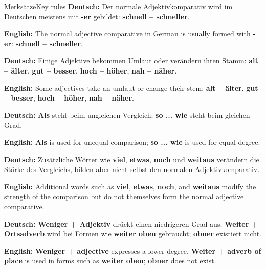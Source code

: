 \documentclass[a4paper,11pt]{article}
\newcommand{\GermanText}[1]{\textbf{Deutsch: }#1\par}
\newcommand{\EnglishText}[1]{{\small\color{SoftGray}\textbf{English: }#1\par}}
\begin{document}
\begin{grammarentry}{Merksätze}{Key rules}
\GermanText{Der normale Adjektivkomparativ wird im Deutschen meistens mit \textbf{-er} gebildet: \textbf{schnell -- schneller}.}
\EnglishText{The normal adjective comparative in German is usually formed with \textbf{-er}: \textbf{schnell -- schneller}.}

\GermanText{Einige Adjektive bekommen Umlaut oder verändern ihren Stamm: \textbf{alt -- älter}, \textbf{gut -- besser}, \textbf{hoch -- höher}, \textbf{nah -- näher}.}
\EnglishText{Some adjectives take an umlaut or change their stem: \textbf{alt -- älter}, \textbf{gut -- besser}, \textbf{hoch -- höher}, \textbf{nah -- näher}.}

\GermanText{\textbf{Als} steht beim ungleichen Vergleich; \textbf{so ... wie} steht beim gleichen Grad.}
\EnglishText{\textbf{Als} is used for unequal comparison; \textbf{so ... wie} is used for equal degree.}

\GermanText{Zusätzliche Wörter wie \textbf{viel}, \textbf{etwas}, \textbf{noch} und \textbf{weitaus} verändern die Stärke des Vergleichs, bilden aber nicht selbst den normalen Adjektivkomparativ.}
\EnglishText{Additional words such as \textbf{viel}, \textbf{etwas}, \textbf{noch}, and \textbf{weitaus} modify the strength of the comparison but do not themselves form the normal adjective comparative.}

\GermanText{\textbf{Weniger + Adjektiv} drückt einen niedrigeren Grad aus. \textbf{Weiter + Ortsadverb} wird bei Formen wie \textbf{weiter oben} gebraucht; \textbf{obner} existiert nicht.}
\EnglishText{\textbf{Weniger + adjective} expresses a lower degree. \textbf{Weiter + adverb of place} is used in forms such as \textbf{weiter oben}; \textbf{obner} does not exist.}
\end{grammarentry}
\end{document}
